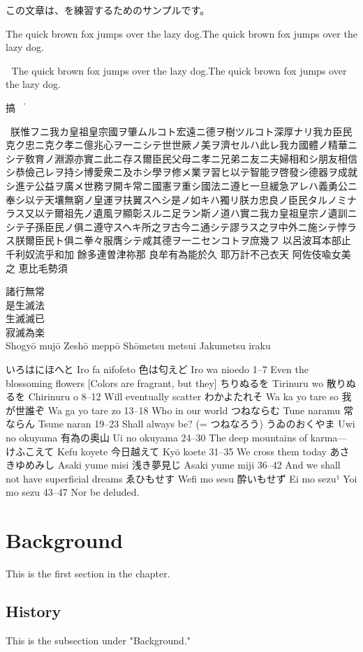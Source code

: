 \documentclass[a5paper, 10pt, openany]{book} %
\begin{document}
この文章は、を練習するためのサンプルです。

The quick brown fox jumps over the lazy dog.The quick brown fox jumps over the lazy dog.

󱜩
The quick brown fox jumps over the lazy dog.The quick brown fox jumps over the lazy dog.

搞$^{'}$
  󱍑  󰼐
󱑡


\ 
朕惟フニ我カ皇祖皇宗國ヲ肇ムルコト宏遠ニ德ヲ樹ツルコト深厚ナリ我カ臣民克ク忠ニ克ク孝ニ億兆心ヲ一ニシテ世世厥ノ美ヲ濟セルハ此レ我カ國體ノ精華ニシテ敎育ノ淵源亦實ニ此ニ存ス爾臣民父母ニ孝ニ兄弟ニ友ニ夫婦相和シ朋友相信シ恭儉己レヲ持シ博愛衆ニ及ホシ學ヲ修メ業ヲ習ヒ以テ智能ヲ啓發シ德器ヲ成就シ進テ公益ヲ廣メ世務ヲ開キ常ニ國憲ヲ重シ國法ニ遵ヒ一旦緩急アレハ義勇公ニ奉シ以テ天壤無窮ノ皇運ヲ扶翼スヘシ是ノ如キハ獨リ朕カ忠良ノ臣民タルノミナラス又以テ爾祖先ノ遺風ヲ顯彰スルニ足ラン斯ノ道ハ實ニ我カ皇祖皇宗ノ遺訓ニシテ子孫臣民ノ俱ニ遵守スヘキ所之ヲ古今ニ通シテ謬ラス之ヲ中外ニ施シテ悖ラス朕爾臣民ト俱ニ拳々服膺シテ咸其德ヲ一ニセンコトヲ庶幾フ
以呂波耳本部止
千利奴流乎和加
餘多連曽津祢那
良牟有為能於久
耶万計不己衣天
阿佐伎喩女美之
恵比毛勢須


諸行無常\\
是生滅法\\
生滅滅已\\
寂滅為楽\\

Shogyō mujō
Zeshō meppō
Shōmetsu metsui
Jakumetsu iraku

いろはにほへと	Iro fa nifofeto	色は匂えど	Iro wa nioedo	1–7	Even the blossoming flowers [Colors are fragrant, but they]
ちりぬるを	Tirinuru wo	散りぬるを	Chirinuru o	8–12	Will eventually scatter
わかよたれそ	Wa ka yo tare so	我が世誰ぞ	Wa ga yo tare zo	13–18	Who in our world
つねならむ	Tune naramu	常ならん	Tsune naran	19–23	Shall always be? (= つねなろう)
うゐのおくやま	Uwi no okuyama	有為の奥山	Ui no okuyama	24–30	The deep mountains of karma—
けふこえて	Kefu koyete	今日越えて	Kyō koete	31–35	We cross them today
あさきゆめみし	Asaki yume misi	浅き夢見じ	Asaki yume miji	36–42	And we shall not have superficial dreams
ゑひもせす	Wefi mo sesu	酔いもせず	Ei mo sezu¹
Yoi mo sezu	43–47	Nor be deluded.


\section{Background}
This is the first section in the chapter.

\subsection{History}
This is the subsection under "Background."
\end{document}
